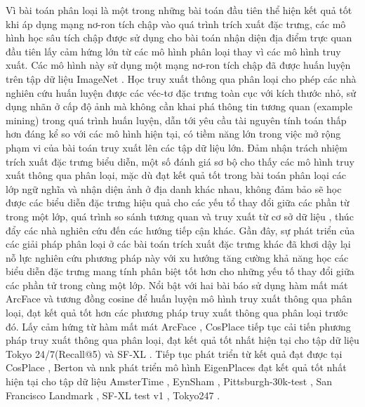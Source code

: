 Vì bài toán phân loại là một trong những bài toán đầu tiên thể hiện kết quả tốt khi áp dụng mạng nơ-ron tích chập vào quá trình trích xuất đặc trưng, các mô hình học sâu tích chập được sử dụng cho bài toán nhận diện địa điểm trực quan đầu tiên lấy cảm hứng lớn từ các mô hình phân loại thay vì các mô hình truy xuất. Các mô hình này sử dụng một mạng nơ-ron tích chập đã được huấn luyện trên tập dữ liệu ImageNet \cite{krizhevsky2012imagenet}. Học truy xuất thông qua phân loại cho phép các nhà nghiên cứu huấn luyện được các véc-tơ đặc trưng toàn cục với kích thước nhỏ, sử dụng nhãn ở cấp độ ảnh mà không cần khai phá thông tin tương quan (example mining) trong quá trình huấn luyện, dẫn tới yêu cầu tài nguyên tính toán thấp hơn đáng kể so với các mô hình hiện tại, có tiềm năng lớn trong việc mở rộng phạm vi của bài toán truy xuất lên các tập dữ liệu lớn. Đảm nhận trách nhiệm trích xuất đặc trưng biểu diễn, một số đánh giá sơ bộ cho thấy các mô hình truy xuất thông qua phân loại, mặc dù đạt kết quả tốt trong bài toán phân loại các lớp ngữ nghĩa và nhận diện ảnh ở địa danh khác nhau, không đảm bảo sẽ học được các biểu diễn đặc trưng hiệu quả cho các yếu tổ thay đổi giữa các phần từ trong một lớp, quá trình so sánh tương quan và truy xuất từ cơ sở dữ liệu \cite{arandjelovic2016netvlad, gordo2016deep, randenovic2016BoW}, thúc đẩy các nhà nghiên cứu đến các hướng tiếp cận khác. Gần đây, sự phát triển của các giải pháp phân loại ở các bài toán trích xuất đặc trưng khác đã khơi dậy lại nỗ lực nghiên cứu phương pháp này với xu hướng tăng cường khả năng học các biểu diễn đặc trưng mang tính phân biệt tốt hơn cho những yếu tố thay đổi giữa các phần tử trong cùng một lớp. Nổi bật với hai bài báo \cite{cao2020unifying, yokoo2020twostage} sử dụng hàm mất mát ArcFace \cite{Deng_2022} và tương đồng cosine để huấn luyện mô hình truy xuất thông qua phân loại, đạt kết quả tốt hơn các phương pháp truy xuất thông qua phân loại trước đó. Lấy cảm hứng từ hàm mất mát ArcFace \cite{Deng_2022}, CosPlace \cite{berton2022rethinking} tiếp tục cải tiến phương pháp truy xuất thông qua phân loại, đạt kết quả tốt nhất hiện tại cho tập dữ liệu Tokyo 24/7(Recall@5) \cite{Torii-CVPR2015} và SF-XL \cite{berton2022rethinking}. Tiếp tục phát triển từ kết quả đạt được tại CosPlace \cite{berton2022rethinking}, Berton và nnk phát triển mô hình EigenPlaces \cite{berton2023eigenplaces} đạt kết quả tốt nhất hiện tại cho tập dữ liệu AmsterTime \cite{yildiz2022amstertime}, EynSham \cite{eynsham2009}, Pittsburgh-30k-test \cite{6618963}, San Francisco Landmark \cite{5995610}, SF-XL test v1 \cite{berton2022rethinking}, Tokyo247 \cite{Torii-CVPR2015}.

